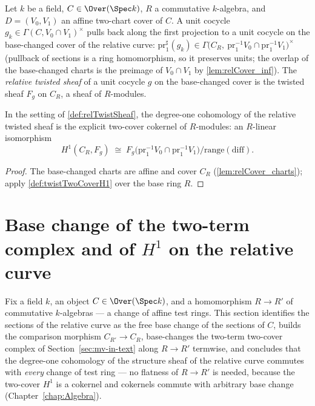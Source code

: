 \begin{definition}
  \label{def:relTwistSheaf}
  \leanok
  Let \(k\) be a field, \(C \in \Over(\Spec k)\), \(R\) a commutative \(k\)-algebra, and
  \(D = (V_0, V_1)\) an affine two-chart cover of \(C\). A unit cocycle
  \(g_k \in \Gamma(C, V_0 \cap V_1)^{\times}\) pulls back along the first projection to a
  unit cocycle on the base-changed cover of the relative curve:
  \(\mathrm{pr}_1^{\sharp}(g_k) \in
  \Gamma\bigl(C_R,\ \mathrm{pr}_1^{-1}V_0 \cap \mathrm{pr}_1^{-1}V_1\bigr)^{\times}\)
  (pullback of sections is a ring homomorphism, so it preserves units; the overlap of the
  base-changed charts is the preimage of \(V_0 \cap V_1\) by \ref{lem:relCover_inf}). The
  \emph{relative twisted sheaf} of a unit cocycle \(g\) on the base-changed cover is the
  twisted sheaf \(F_g\) on \(C_R\), a sheaf of \(R\)-modules.
\end{definition}

\begin{definition}
  \label{def:relTwistTwoCoverH1}
  \leanok
  In the setting of \ref{def:relTwistSheaf}, the degree-one cohomology of the relative
  twisted sheaf is the explicit two-cover cokernel of \(R\)-modules: an \(R\)-linear
  isomorphism
  \[
    H^1(C_R, F_g) \;\cong\;
      F_g\bigl(\mathrm{pr}_1^{-1}V_0 \cap \mathrm{pr}_1^{-1}V_1\bigr) \big/
        \mathrm{range}(\mathrm{diff}) .
  \]
\end{definition}
\begin{proof}
  \leanok
  The base-changed charts are affine and cover \(C_R\) (\ref{lem:relCover_charts});
  apply \ref{def:twistTwoCoverH1} over the base ring \(R\).
\end{proof}

\section{Base change of the two-term complex and of \(H^1\) on the relative curve}
\label{sec:relative_h1_base_change}

Fix a field \(k\), an object \(C \in \Over(\Spec k)\), and a homomorphism \(R \to R'\) of
commutative \(k\)-algebras --- a change of affine test rings. This section identifies the
sections of the relative curve as the free base change of the sections of \(C\), builds
the comparison morphism \(C_{R'} \to C_R\), base-changes the two-term two-cover complex
of Section~\ref{sec:mv-in-text} along \(R \to R'\) termwise, and concludes that the
degree-one cohomology of the structure sheaf of the relative curve commutes with
\emph{every} change of test ring --- no flatness of \(R \to R'\) is needed, because the
two-cover \(H^1\) is a cokernel and cokernels commute with arbitrary base change
(Chapter~\ref{chap:Algebra}).

